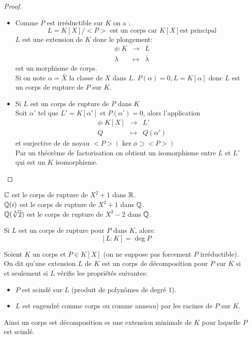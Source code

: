 \begin{proof}

	\begin{itemize}
		\item Comme $P$ est irréductible sur $K$ on a :
		      $$ L = K[X]/<P> \text{ est un corps car } K[X] \text{est principal}$$
		      $L$ est une extension de $K$ donc le plongement:
		      \begin{eqnarray*}
			      \phi: K &\to& L\\
			      \lambda   &\mapsto &\bar{\lambda}
		      \end{eqnarray*}
		      est un morphisme de corps.\\
		      Si on note $\alpha = \bar{X}$ la classe de $X$ dans $L$. $P(\alpha) = 0, L = K[\alpha]$
		      donc $L$ est un corps de rupture de $P$ sur $K$.
		\item Si $L$ est un corps de rupture de $P$ dans $K$ \\
		      Soit $\alpha'$ tel que $L' = K[\alpha']$ et $P(\alpha') = 0$, alors l'application
		      \begin{eqnarray*}
			      \phi : K[X] &\to& L'\\
			      Q &   \mapsto & Q(\alpha')
		      \end{eqnarray*}
		      et surjective de de noyau $<P> (\ker \phi \supset <P>)$\\
		      Par un théorème de factorisation on obtient un isomorphisme entre $L$ et $L'$ qui est un $K$ isomorphisme.
	\end{itemize}
\end{proof}

\begin{example}
	$\mathbb{C}$ est le corps de rupture de $X^2+1$ dans $\mathbb{R}$.\\
	$\mathbb{Q}(i)$ est le corps de rupture de $X^2+1$ dans $\mathbb{Q}$.\\
	$\mathbb{Q}(\sqrt[3]{2})$ est le corps de rupture de $X^3-2$ dans $\mathbb{Q}$.\\
\end{example}

\begin{remarque}[Important]
	Si $L$ est un corps de rupture pour $P$ dans $K$, alors:
	$$ [L : K] = \deg P$$
\end{remarque}


\begin{definition}
	Soient $K$ un corps et $P\in K[X]$ (on ne suppose pas forcement $P$ irréductible).\\
	On dit qu'une extension $L$ de $K$ est un corps de décomposition pour $P$ sur $K$ si et seulement si $L$ vérifie les propriétés suivantes:
	\begin{itemize}
		\item $P$ est scindé sur $L$ (produit de polynômes de degré 1).
		\item $L$ est engendré comme corps ou comme anneau) par les racines de $P$ sur $K$.
	\end{itemize}

	Ainsi un corps est décomposition es une extension minimale de $K$ pour laquelle $P$ est scindé.
\end{definition}

